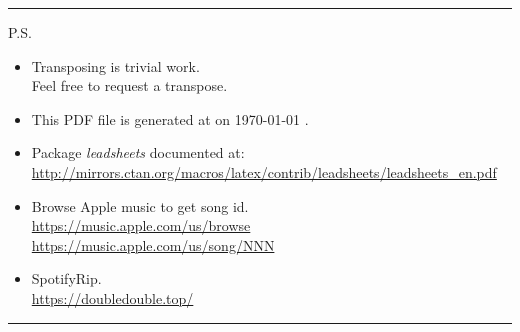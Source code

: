 \documentclass{article}
\begin{document}




\label{lbtoc}
\newcommand{\cursec}[0]{}
\tableofcontents
\bigskip
\hrule
\bigskip
P.S.
\begin{itemize}
  \item Transposing is trivial work. \\ Feel free to request a transpose.
  \item This PDF file is generated at \textbraceleft{} \currenttime{} \textbraceright{} on \textbraceleft{} \today{} \textbraceright{}.
  \item Package \textit{leadsheets} documented at: \\ \url{http://mirrors.ctan.org/macros/latex/contrib/leadsheets/leadsheets_en.pdf}
  \item Browse Apple music to get song id. \\ \url{https://music.apple.com/us/browse} \\ \url{https://music.apple.com/us/song/NNN}
  \item SpotifyRip. \\ \url{https://doubledouble.top/}
\end{itemize}
\hrule

\newcommand{\hfbrly}[0]{
  \part{hfbrly}
  \NSsongC{+2}{D}{sharp}{1556948287}{House Of The Lord}{Phil Wickham}{Hilda}{D}
  \NSsongC{+2}{D}{sharp}{1107291445}{Way Maker}{Sinach}{Enoch}{D}
  \NSsongC{-5}{G}{sharp}{1150732526}{Do It Again}{Elevation Worship}{Jeison}{G}
  \NSsongC{-3}{A}{sharp}{1440842278}{Amazing Grace My Chains Are Gone}{Chris Tomlin}{Billy}{A}
}
  
\end{document}
